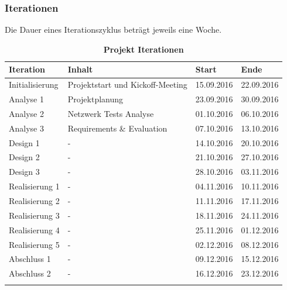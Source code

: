 \documentclass[a4,12pt]{scrartcl}
\begin{document}
\subsubsection{Iterationen}
Die Dauer eines Iterationszyklus beträgt jeweils eine Woche. 
\begin{table}[htb]
\centering
    \begin{tabular}{@{} p{3cm} l l l@{}}\toprule    
    {Iteration} & {Inhalt} & {Start} & {Ende}\\ \midrule
    Initialisierung & Projektstart und Kickoff-Meeting & 15.09.2016 & 22.09.2016\\ \addlinespace
    Analyse 1 & Projektplanung & 23.09.2016 & 30.09.2016\\ \addlinespace
    Analyse 2 & Netzwerk Tests Analyse & 01.10.2016 & 06.10.2016\\ \addlinespace
    Analyse 3 & Requirements \& Evaluation & 07.10.2016 & 13.10.2016\\ \addlinespace
    Design 1 & - & 14.10.2016 & 20.10.2016\\ \addlinespace
    Design 2 & - & 21.10.2016 & 27.10.2016\\ \addlinespace
    Design 3 & - & 28.10.2016  & 03.11.2016\\ \addlinespace
    Realisierung 1 & - & 04.11.2016  & 10.11.2016\\ \addlinespace
    Realisierung 2 & - & 11.11.2016  & 17.11.2016\\ \addlinespace
    Realisierung 3 & - & 18.11.2016  & 24.11.2016\\ \addlinespace
    Realisierung 4 & - & 25.11.2016  & 01.12.2016\\ \addlinespace
    Realisierung 5 & - & 02.12.2016  & 08.12.2016\\ \addlinespace
    Abschluss 1 & - &  09.12.2016 & 15.12.2016\\ \addlinespace
    Abschluss 2 & - &  16.12.2016 & 23.12.2016\\ \addlinespace
    \bottomrule
    \end{tabular}
\caption{\textbf{Projekt Iterationen}}
\end{table}
\end{document}
